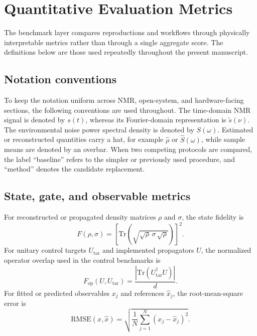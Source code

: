 \documentclass[11pt,a4paper]{article}
\begin{document}
\section{Quantitative Evaluation Metrics}

The benchmark layer compares reproductions and workflows through physically
interpretable metrics rather than through a single aggregate score.  The
definitions below are those used repeatedly throughout the present manuscript.

\subsection{Notation conventions}

To keep the notation uniform across NMR, open-system, and hardware-facing
sections, the following conventions are used throughout.  The time-domain NMR
signal is denoted by $s(t)$, whereas its Fourier-domain representation is
$\tilde{s}(\nu)$.  The environmental noise power spectral density is denoted by
$S(\omega)$.  Estimated or reconstructed quantities carry a hat, for example
$\hat{\rho}$ or $\hat{S}(\omega)$, while sample means are denoted by an
overbar.  When two competing protocols are compared, the label ``baseline''
refers to the simpler or previously used procedure, and ``method'' denotes the
candidate replacement.

\subsection{State, gate, and observable metrics}

For reconstructed or propagated density matrices $\rho$ and $\sigma$, the state
fidelity is
\begin{equation}
  F(\rho,\sigma)=
  \left[
    \mathrm{Tr}
    \left(
      \sqrt{\sqrt{\rho}\,\sigma\,\sqrt{\rho}}
    \right)
  \right]^2.
\end{equation}
For unitary control targets $U_{\mathrm{tar}}$ and implemented propagators
$U$, the normalized operator overlap used in the control benchmarks is
\begin{equation}
  F_{\mathrm{op}}(U,U_{\mathrm{tar}})
  =
  \frac{\left|\mathrm{Tr}\!\left(U_{\mathrm{tar}}^\dagger U\right)\right|}{d}.
\end{equation}
For fitted or predicted observables $x_j$ and references $\hat{x}_j$, the
root-mean-square error is
\begin{equation}
  \mathrm{RMSE}(x,\hat{x})
  =
  \sqrt{\frac{1}{N}\sum_{j=1}^{N}(x_j-\hat{x}_j)^2}.
\end{equation}
\end{document}
